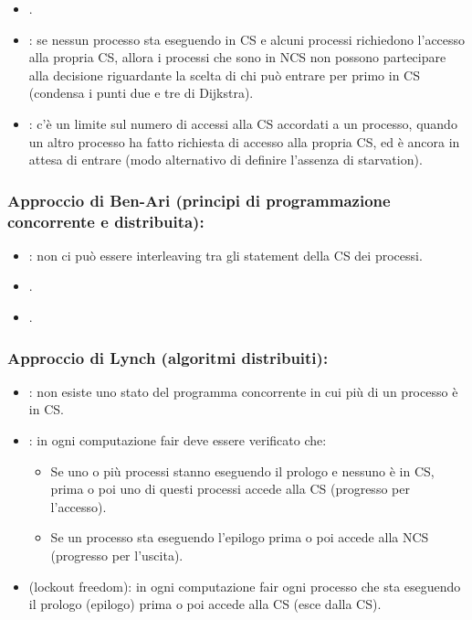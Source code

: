 \begin{itemize}
  \item {}.
  \item {}: se nessun processo sta eseguendo in CS e alcuni processi richiedono l'accesso alla propria CS, allora i processi che sono in NCS non possono partecipare alla decisione riguardante la scelta di chi può entrare per primo in CS (condensa i punti due e tre di Dijkstra).
  \item {}: c'è un limite sul numero di accessi alla CS accordati a un processo, quando un altro processo ha fatto richiesta di accesso alla propria CS, ed è ancora in attesa di entrare (modo alternativo di definire l'assenza di starvation).
\end{itemize}

\subsubsection{Approccio di Ben-Ari (principi di programmazione concorrente e distribuita):}

\begin{itemize}
  \item {}: non ci può essere interleaving tra gli statement della CS dei processi.
  \item {}.
  \item {}.
\end{itemize}

\subsubsection{Approccio di Lynch (algoritmi distribuiti):}

\begin{itemize}
  \item {}: non esiste uno stato del programma concorrente in cui più di un processo è in CS.
  \item {}: in ogni computazione fair deve essere verificato che:
    \begin{itemize}
      \item Se uno o più processi stanno eseguendo il prologo e nessuno è in CS, prima o poi uno di questi processi accede alla CS (progresso per l'accesso).
      \item Se un processo sta eseguendo l'epilogo prima o poi accede alla NCS (progresso per l'uscita).
    \end{itemize}
  \item {} (lockout freedom): in ogni computazione fair ogni processo che sta eseguendo il prologo (epilogo) prima o poi accede alla CS (esce dalla CS).
\end{itemize}

